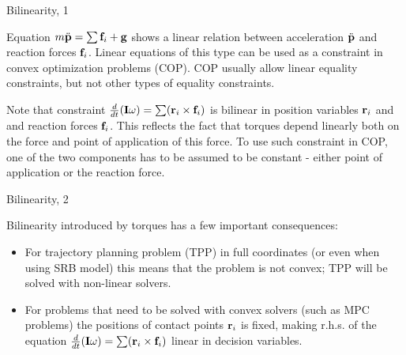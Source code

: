 \documentclass{beamer}
\begin{document}
\begin{frame}{Bilinearity, 1}
	\begin{flushleft}
		
		Equation $m \ddot{\mathbf{p}} = \sum \mathbf{f}_i + \mathbf{g} $ shows a linear relation between acceleration $\ddot{\mathbf{p}}$ and reaction forces $\mathbf{f}_i$. Linear equations of this type can be used as a constraint in convex optimization problems (COP). COP usually allow linear equality constraints, but not other types of equality constraints. 
		
		\bigskip
		
		Note that constraint $\frac{d}{dt}(\mathbf{I}\omega) = \sum (\mathbf{r}_i \times \mathbf{f}_i)$ is bilinear in position variables $\mathbf{r}_i$ and and reaction forces $\mathbf{f}_i$. This reflects the fact that torques depend linearly both on the force and point of application of this force. To use such constraint in COP, one of the two components has to be assumed to be constant - either point of application or the reaction force.
		
	\end{flushleft}
\end{frame}



\begin{frame}{Bilinearity, 2}
	\begin{flushleft}
		
		Bilinearity introduced by torques has a few important consequences:
		
		\begin{itemize}
			\item For trajectory planning problem (TPP) in full coordinates (or even when using SRB model) this means that the problem is not convex; TPP will be solved with non-linear solvers.
			
			\item For problems that need to be solved with convex solvers (such as MPC problems) the positions of contact points $\mathbf{r}_i$ is fixed, making r.h.s. of the equation $\frac{d}{dt}(\mathbf{I}\omega) = \sum (\mathbf{r}_i \times \mathbf{f}_i)$ linear in decision variables.
		\end{itemize}
		
	\end{flushleft}
\end{frame}
\end{document}

